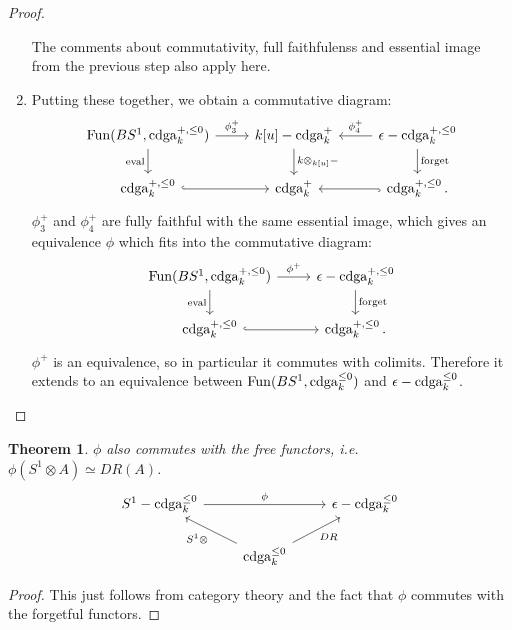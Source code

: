 \documentclass[10pt,a4paper,reqno,oneside]{book} %
\theoremstyle{plain}
\newtheorem{thm}{Theorem}[section]
\theoremstyle{definition}
\theoremstyle{remark}
\numberwithin{equation}{section}
\begin{document}
\begin{proof}
\begin{enumerate}
\[\]
The comments about commutativity, full faithfulenss and essential image from the previous step also apply here.
\item Putting these together, we obtain a commutative diagram:
\[
\begin{tikzcd}
\Fun(BS^1, \cdga_k^{+,\leq 0})\arrow{r}{\phi_3^+}\arrow[swap]{d}{\text{eval}} & k[u]-\cdga^+_k\arrow{d}{k\otimes_{k[u]} -}
& \epsilon-\cdga_k^{+,\leq 0}\arrow[swap]{l}{\phi_4^+}\arrow{d}{\text{forget}} \\
\cdga_k^{+,\leq 0}\arrow[hook]{r} & \cdga_k^+ & \cdga_k^{+,\leq 0}\arrow[hook]{l} .
\end{tikzcd}
\]
$\phi_3^+$ and $\phi_4^+$ are fully faithful with the same essential image, which gives an equivalence $\phi$ which
fits into the commutative diagram:
\[
\begin{tikzcd}
\Fun(BS^1, \cdga_k^{+,\leq 0})\arrow{r}{\phi^+}\arrow[swap]{d}{\text{eval}} & \epsilon-\cdga_k^{+,\leq 0}\arrow{d}{\text{forget}} \\
\cdga_k^{+,\leq 0}\arrow[hook]{r} &  \cdga_k^{+,\leq 0} .
\end{tikzcd}
\]
$\phi^+$ is an equivalence, so in particular it commutes with colimits. Therefore it extends to an equivalence between
$\operatorname{Fun}(BS^1, \operatorname{cdga}_k^{\leq 0})$ and $\epsilon-\operatorname{cdga}_k^{\leq 0}$.
\end{enumerate}
\end{proof}

\begin{thm}
$\phi$ also commutes with the free functors, i.e. $\phi(S^1\otimes A) \simeq DR(A)$.
\[
\begin{tikzcd}
S^1 - \cdga_k^{\leq 0}\arrow{rr}{\phi} & & \epsilon - \cdga_k^{\leq 0} \\
 & \cdga_k^{\leq 0}\arrow[swap]{ur}{DR}\arrow{ul}{S^1 \otimes} & 
\end{tikzcd}
\]
\end{thm}
\begin{proof}
This just follows from category theory and the fact that $\phi$ commutes with the forgetful functors.
\end{proof}
\end{document}
